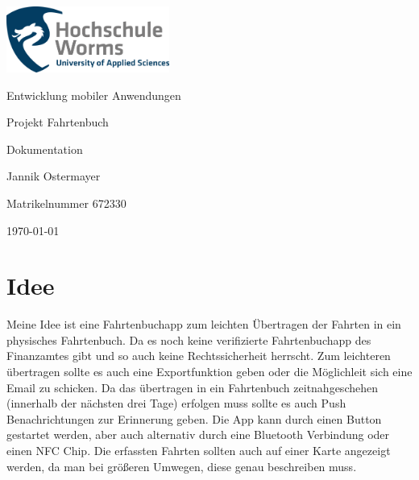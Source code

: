 \documentclass[a4paper]{article}
\author{Jannik Ostermayer}
\begin{document}
\pagestyle{scrheadings}         %
\clearpairofpagestyles          %
\ofoot{\pagemark}

\begin{titlepage}

	\centering
	\includegraphics[width=0.4\textwidth]{img/Logo_HS_Worms.png}\par\vspace{1cm}
	{\LARGE Entwicklung mobiler Anwendungen \par}
	\vspace{1.5cm}
	{\huge Projekt Fahrtenbuch\par}
	\vspace{0.3cm}
	{\huge Dokumentation\par}
	\vspace{2cm}
	{\Large Jannik Ostermayer\par}
	\vspace{1cm}
	{ Matrikelnummer 672330 \par}
	\vfill

	{\large \today\par}

\end{titlepage}

\tableofcontents    %
\pagebreak          %

\section{Idee}
Meine Idee ist eine Fahrtenbuchapp zum leichten Übertragen 
der Fahrten in ein physisches Fahrtenbuch.
Da es noch keine verifizierte Fahrtenbuchapp 
des Finanzamtes gibt und so auch keine Rechtssicherheit herrscht.
Zum leichteren übertragen sollte es auch eine Exportfunktion geben oder
die Möglichleit sich eine Email zu schicken.
Da das übertragen in ein Fahrtenbuch zeitnahgeschehen (innerhalb der 
nächsten drei Tage) erfolgen muss sollte es auch Push Benachrichtungen
zur Erinnerung geben. Die App kann durch einen Button gestartet werden,
aber auch alternativ durch eine Bluetooth Verbindung oder einen NFC Chip.
Die erfassten Fahrten sollten auch auf einer Karte angezeigt werden,
da man bei größeren Umwegen, diese genau beschreiben muss.
\end{document}
